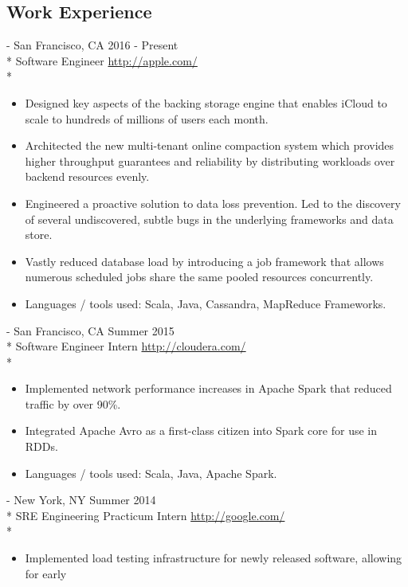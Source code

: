 \documentclass[overlapped,line]{resume}
\newcommand{\rurl}[1]{\hfill {\footnotesize \url{#1}}}
\newcommand{\rdate}[1]{\hfill {\small #1}}
\renewcommand{\employer}[5]{ \item[#1] - #2 \rdate{#3} \\* #4 \rurl{#5} \\* \vspace{-5mm}}
\begin{document}
\begin{resume}

\section{\mysidestyle Work Experience}

  \begin{asparadesc}
    \employer{Apple Inc. (iCloud)}{San Francisco, CA}{2016 - Present}{Software
      Engineer}{http://apple.com/}
    \begin{itemize}
      \item Designed key aspects of the backing storage engine that enables iCloud to scale to
        hundreds of millions of users each month.
      \item Architected the new multi-tenant online compaction system which provides higher
        throughput guarantees and reliability by distributing workloads over backend resources
        evenly.
      \item Engineered a proactive solution to data loss prevention. Led to the discovery of
        several undiscovered, subtle bugs in the underlying frameworks and data store.
      \item Vastly reduced database load by introducing a job framework that allows numerous
        scheduled jobs share the same pooled resources concurrently.
      \item Languages / tools used: Scala, Java, Cassandra, MapReduce Frameworks.
    \end{itemize}
    \employer{Cloudera}{San Francisco, CA}{Summer 2015}{Software Engineer
      Intern}{http://cloudera.com/}
    \begin{itemize}
      \item Implemented network performance increases in Apache Spark that reduced traffic by over
        90\%.
      \item Integrated Apache Avro as a first-class citizen into Spark core for use in RDDs.
      \item Languages / tools used: Scala, Java, Apache Spark.
    \end{itemize}
    \employer{Google}{New York, NY}{Summer 2014}{SRE Engineering Practicum
      Intern}{http://google.com/}
    \begin{itemize}
      \item Implemented load testing infrastructure for newly released software, allowing for early

\end{itemize}
\end{asparadesc}
\end{resume}
\end{document}
